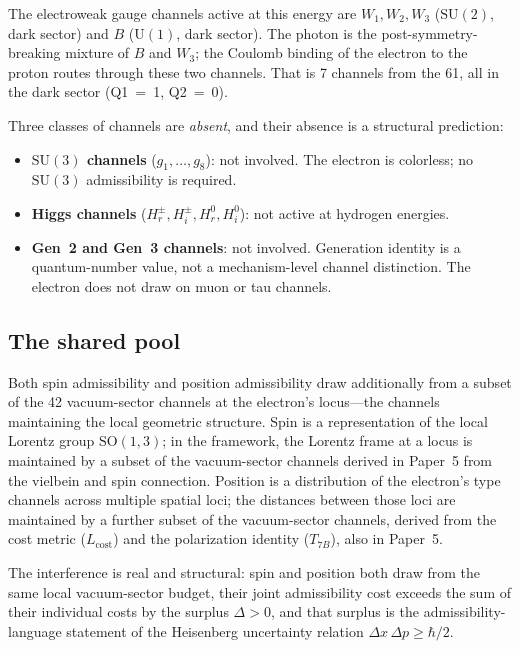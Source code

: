 \documentclass[11pt]{article}
\newenvironment{varlist}{\begin{itemize}[nosep,leftmargin=2em]}{\end{itemize}}
\newcommand{\SU}{\mathrm{SU}}
\newcommand{\U}{\mathrm{U}}
\begin{document}
The electroweak gauge channels active at this energy are $W_1, W_2, W_3$
($\SU(2)$, dark sector) and $B$ ($\U(1)$, dark sector).  The photon is
the post-symmetry-breaking mixture of $B$ and $W_3$; the Coulomb binding
of the electron to the proton routes through these two channels.  That is
7 channels from the 61, all in the dark sector (Q1~=~1, Q2~=~0).

Three classes of channels are \emph{absent}, and their absence is a
structural prediction:

\begin{varlist}
\item \textbf{$\SU(3)$ channels} ($g_1,\ldots,g_8$): not involved.  The
electron is colorless; no $\SU(3)$ admissibility is required.
\item \textbf{Higgs channels} ($H^\pm_r, H^\pm_i, H^0_r, H^0_i$): not
active at hydrogen energies.
\item \textbf{Gen~2 and Gen~3 channels}: not involved.  Generation
identity is a quantum-number value, not a mechanism-level channel
distinction.  The electron does not draw on muon or tau channels.
\end{varlist}

\subsection*{The shared pool}

Both spin admissibility and position admissibility draw additionally from a
subset of the 42 vacuum-sector channels at the electron's
locus---the channels maintaining the local geometric structure.  Spin is
a representation of the local Lorentz group $\mathrm{SO}(1,3)$; in the
framework, the Lorentz frame at a locus is maintained by a subset of the
vacuum-sector channels derived in Paper~5 from the vielbein and spin
connection.  Position is a distribution of the electron's type channels
across multiple spatial loci; the distances between those loci are
maintained by a further subset of the vacuum-sector channels, derived
from the cost metric ($L_{\mathrm{cost}}$) and the polarization identity
($T_{7B}$), also in Paper~5.

The interference is real and structural: spin and position both draw from
the same local vacuum-sector budget, their joint admissibility cost exceeds
the sum of their individual costs by the surplus $\Delta > 0$, and that
surplus is the admissibility-language statement of the Heisenberg
uncertainty relation $\Delta x\,\Delta p \ge \hbar/2$.
\end{document}
